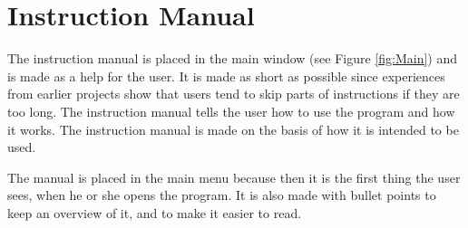 \section{Instruction Manual}
The instruction manual is placed in the main window (see Figure \ref{fig:Main}) and is made as a help for the user. It is made as short as possible since experiences from earlier projects show that users tend to skip parts of instructions if they are too long. The instruction manual tells the user how to use the program and how it works. The instruction manual is made on the basis of how it is intended to be used.

The manual is placed in the main menu because then it is the first thing the user sees, when he or she opens the program. It is also made with bullet points to keep an overview of it, and to make it easier to read.